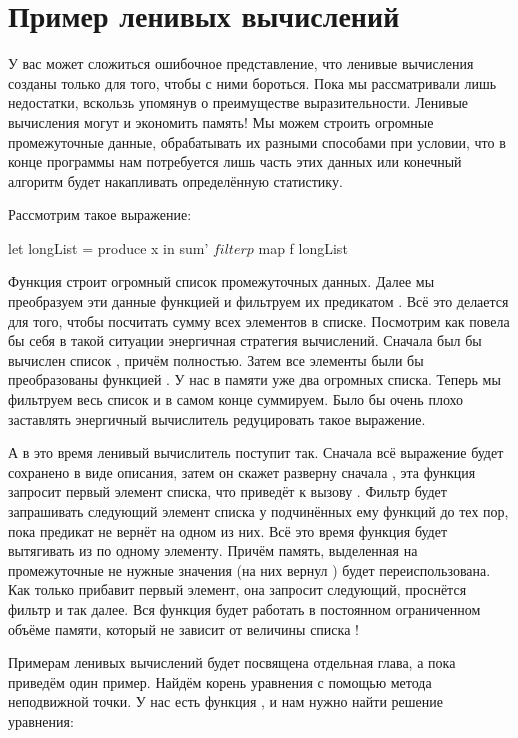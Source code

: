 \section{Пример ленивых вычислений}

У вас может сложиться ошибочное представление, 
что ленивые вычисления созданы только для того,
чтобы с ними бороться. Пока мы рассматривали лишь недостатки,
вскользь упомянув о преимуществе выразительности. 
Ленивые вычисления могут и экономить память! 
Мы можем строить огромные промежуточные данные,
обрабатывать их разными способами при условии, что 
в конце программы нам потребуется лишь часть
этих данных или конечный алгоритм будет накапливать
определённую статистику. 

Рассмотрим такое выражение:

\begin{code}
let longList = produce x
in  sum' $ filter p $ map f longList 
\end{code}

Функция  строит огромный список промежуточных данных.
Далее мы преобразуем эти данные функцией  и фильтруем их
предикатом . Всё это делается для того, чтобы посчитать
сумму всех элементов в списке. Посмотрим как повела бы
себя в такой ситуации энергичная стратегия вычислений. 
Сначала был бы вычислен список , причём полностью.
Затем все элементы были бы преобразованы функцией .
У нас в памяти уже два огромных списка. Теперь мы фильтруем
весь список и в самом конце суммируем. Было бы очень 
плохо заставлять энергичный вычислитель редуцировать такое 
выражение. 

А в это время ленивый вычислитель поступит так.
Сначала всё выражение будет сохранено в виде описания, затем
он скажет разверну сначала , эта функция
запросит первый элемент списка, что приведёт к вызову 
. Фильтр будет запрашивать следующий элемент
списка у подчинённых ему функций до тех пор, пока 
предикат  не вернёт  на одном из них. 
Всё это время функция  будет вытягивать из 
 по одному элементу. Причём память, выделенная
на промежуточные не нужные значения (на них  вернул )
будет переиспользована. Как только  прибавит первый
элемент, она запросит следующий, проснётся фильтр и так далее.
Вся функция будет работать в постоянном ограниченном объёме памяти, который 
не зависит от величины списка !

Примерам ленивых вычислений будет посвящена отдельная
глава, а пока приведём один пример. Найдём корень уравнения 
с помощью метода неподвижной точки.
У нас есть функция , и нам нужно найти 
решение уравнения:

